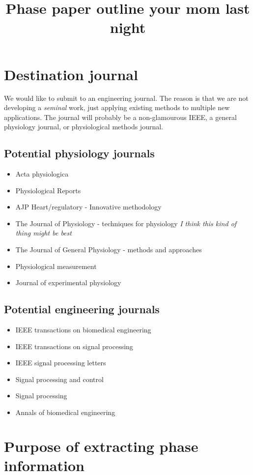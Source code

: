\documentclass{article}
\title{Phase paper outline your mom last night}
\author{}
\date{}
\begin{document}
\maketitle

\section*{Destination journal}
We would like to submit to an engineering journal. The reason is that we are not developing a \textit{seminal} work, just applying existing methods to multiple new applications. The journal will probably be a non-glamourous IEEE, a general physiology journal, or physiological methods journal. 

\subsection*{Potential physiology journals}

\begin{itemize}
\item Acta physiologica
\item Physiological Reports
\item AJP Heart/regulatory - Innovative methodology
\item The Journal of Physiology - techniques for physiology \textit{I think this kind of thing might be best}
\item The Journal of General Physiology - methods and approaches
\item Physiological measurement
\item Journal of experimental physiology
\end{itemize}

\subsection*{Potential engineering journals}
\begin{itemize}
\item IEEE transactions on biomedical engineering
\item IEEE transactions on signal processing
\item IEEE signal processing letters
\item Signal processing and control
\item Signal processing
\item Annals of biomedical engineering
\end{itemize}


\section*{Purpose of extracting phase information}
\end{document}
